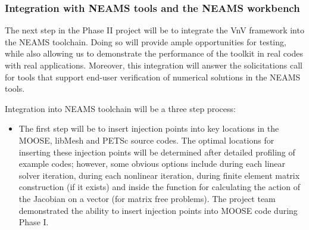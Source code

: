 \subsubsection{Integration with NEAMS tools and the NEAMS workbench} 

The next step in the Phase II project will be to integrate the VnV framework into the NEAMS 
toolchain. Doing so will provide ample opportunities for testing, while also allowing us to demonstrate the performance of the toolkit in real codes with
real applications. Moreover, this integration will answer the solicitations call for tools that support end-user verification of numerical solutions in the NEAMS tools. 

Integration into NEAMS toolchain will be a three step process:

\begin{itemize}
 \item The first step will be to insert injection points into key locations in the MOOSE, libMesh and PETSc source codes. The optimal locations for 
 inserting these injection points will be determined after detailed profiling of example codes; however, some obvious options include during each linear 
 solver iteration, during each nonlinear iteration, during finite element matrix construction (if it exists) and inside the function for calculating the action of the Jacobian
 on a vector (for matrix free problems). The project team demonstrated the ability to insert injection points into MOOSE code during Phase I. 
 

\end{itemize}
